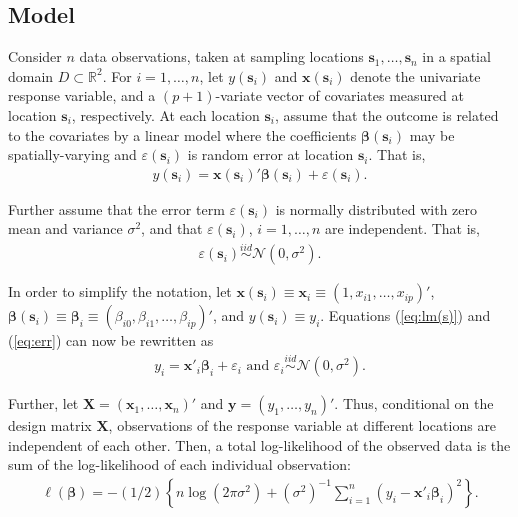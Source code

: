 \documentclass[authoryear, review, 11pt]{elsarticle}
\begin{document}
	\subsection{Model}	
	Consider $n$ data observations, taken at sampling locations $\bm{s}_1, \dots, \bm{s}_n$ in a spatial domain $D \subset \mathbb{R}^2$. For $i = 1, \dots, n$, let $y(\bm{s}_i)$ and $\bm{x}(\bm{s}_i)$ denote the univariate response variable, and a $(p+1)$-variate vector of covariates measured at location $\bm{s}_i$, respectively. At each location $\bm{s}_i$, assume that the outcome is related to the covariates by a linear model where the coefficients $\bm{\beta}(\bm{s}_i)$ may be spatially-varying and $\varepsilon(\bm{s}_i)$ is random error at location $\bm{s}_i$. That is,
	\begin{align}\label{eq:lm(s)}
		y(\bm{s}_i) = \bm{x}(\bm{s}_i)' \bm{\beta}(\bm{s}_i) + \varepsilon(\bm{s}_i).
	\end{align}
	
	Further assume that the error term $\varepsilon(\bm{s}_i)$ is normally distributed with zero mean and variance $\sigma^2$, and that $\varepsilon(\bm{s}_i)$, $i=1, \dots, n$ are independent. That is,
	\begin{align} \label{eq:err}
		\varepsilon(\bm{s}_i) \overset{iid}{\sim} \mathcal{N} \left( 0,\sigma^2 \right).
	\end{align}
	
	In order to simplify the notation, let $\bm{x}(\bm{s}_i) \equiv \bm{x}_i \equiv \left( 1, x_{i1}, \dots, x_{ip} \right)'$, $\bm{\beta}(\bm{s}_i) \equiv \bm{\beta}_i \equiv \left(\beta_{i0}, \beta_{i1}, \dots, \beta_{ip} \right)'$, and $y(\bm{s}_i) \equiv y_i$.  Equations (\ref{eq:lm(s)}) and (\ref{eq:err}) can now be rewritten as
	\begin{align}
		y_i = \bm{x}'_i \bm{\beta}_i + \varepsilon_i \text{ and } \varepsilon_i \overset{iid}{\sim} \mathcal{N} \left( 0,\sigma^2 \right).
	\end{align}
	
	Further, let $\bm{X} = \left( \bm{x}_1, \dots, \bm{x}_n \right)'$ and $\bm{y} = \left( y_1, \dots, y_n \right)'$. Thus, conditional on the design matrix $\bm{X}$, observations of the response variable at different locations are independent of each other. Then, a total log-likelihood of the observed data is the sum of the log-likelihood of each individual observation:
	 \begin{align}
	 	\ell\left( \bm{\beta} \right) = - \left(1/2\right) \left\{ n \log \left( 2 \pi \sigma^2\right) +  \left(\sigma^{2}\right)^{-1}  \sum_{i=1}^n \left(y_i - \bm{x}'_i\bm{\beta}_i \right)^2  \right\}.
	\end{align}
	
\end{document}
